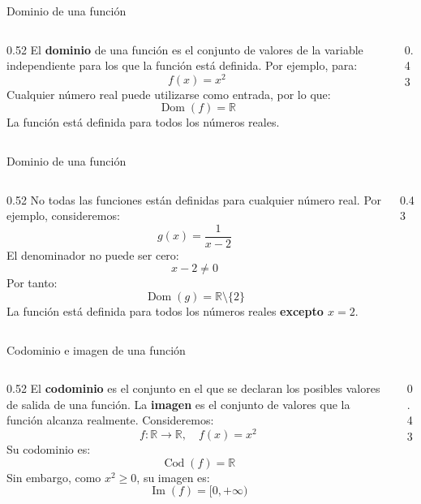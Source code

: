 \documentclass[main.tex]{subfiles}
\begin{document}
\begin{frame}{Dominio de una función}
\begin{columns}[c]
\begin{column}{0.52\textwidth}
El \textbf{dominio} de una función es el conjunto de valores de la variable independiente para los que la función está definida.
\vspace{0.4cm}
Por ejemplo, para:
\[f(x)=x^2\]
Cualquier número real puede utilizarse como entrada, por lo que:
\[\operatorname{Dom}(f)=\mathbb{R}\]
La función está definida para todos los números reales.
\end{column}
\begin{column}{0.43\textwidth}
\centering
{}
\end{column}
\end{columns}
\end{frame}

\begin{frame}{Dominio de una función}
\begin{columns}[c]
\begin{column}{0.52\textwidth}
No todas las funciones están definidas para cualquier número real.
\vspace{0.4cm}
Por ejemplo, consideremos:
\[g(x)=\frac{1}{x-2}\]
El denominador no puede ser cero:
\[x-2\neq 0\]
Por tanto:
\[\operatorname{Dom}(g)=\mathbb{R}\setminus\{2\}\]
La función está definida para todos los números reales \textbf{excepto $x=2$}.
\end{column}
\begin{column}{0.43\textwidth}
\centering
{}
\end{column}
\end{columns}
\end{frame}

\begin{frame}{Codominio e imagen de una función}
\begin{columns}[c]
\begin{column}{0.52\textwidth}
El \textbf{codominio} es el conjunto en el que se declaran los posibles valores de salida de una función.
\vspace{0.3cm}
La \textbf{imagen} es el conjunto de valores que la función alcanza realmente.
\vspace{0.4cm}
Consideremos:
\[f:\mathbb{R}\rightarrow\mathbb{R},\quad f(x)=x^2\]
Su codominio es:
\[\operatorname{Cod}(f)=\mathbb{R}\]
Sin embargo, como $x^2\geq 0$, su imagen es:
\[\operatorname{Im}(f)=[0,+\infty)\]
\end{column}
\begin{column}{0.43\textwidth}
\centering
{}
\end{column}
\end{columns}
\end{frame}
\end{document}
